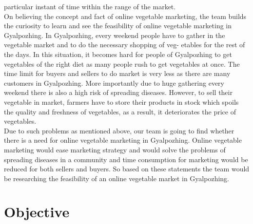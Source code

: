\documentclass[12pt]{report}
\begin{document}
\begin{normalsize}
particular instant of time within the range of the market.\newline\\[0.1cm]
On believing the concept and fact of online vegetable marketing, the team builds the curiosity to
learn and see the feasibility of online vegetable marketing in Gyalpozhing. In Gyalpozhing, every
weekend people have to gather in the vegetable market and to do the necessary shopping of veg-
etables for the rest of the days. In this situation, it becomes hard for people of Gyalpozhing to get
vegetables of the right diet as many people rush to get vegetables at once. The time limit for buyers
and sellers to do market is very less as there are many customers in Gyalpozhing. More importantly
due to huge gathering every weekend there is also a high risk of spreading diseases. However, to
sell their vegetable in market, farmers have to store their products in stock which spoils the quality
and freshness of vegetables, as a result, it deteriorates the price of vegetables.\newline\\[0.1cm]
Due to such problems as mentioned above, our team is going to find whether there is a need for
online vegetable marketing in Gyalpozhing. Online vegetable marketing would ease marketing strategy and would solve the problems of spreading diseases in a community and time consumption for
marketing would be reduced for both sellers and buyers. So based on these statements the team
would be researching the feasibility of an online vegetable market in Gyalpozhing.




\section{Objective}


\end{normalsize}
\end{document}
